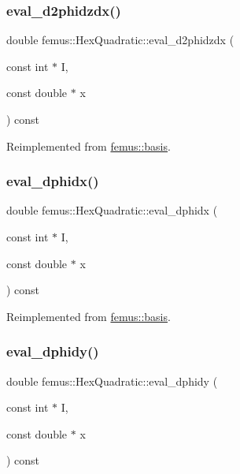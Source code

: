 \subsubsection{\texorpdfstring{eval\+\_\+d2phidzdx()}{eval\_d2phidzdx()}}
{\footnotesize\ttfamily double femus\+::\+Hex\+Quadratic\+::eval\+\_\+d2phidzdx (\begin{DoxyParamCaption}\item[{const int $\ast$}]{I,  }\item[{const double $\ast$}]{x }\end{DoxyParamCaption}) const\hspace{0.3cm}{\ttfamily [virtual]}}



Reimplemented from \mbox{\hyperlink{classfemus_1_1basis_a5d619ec5bd57b7d2dc34a99d69975c77}{femus\+::basis}}.

\mbox{\label{classfemus_1_1_hex_quadratic_ad67c4453b00ce3cfb6ff4458fea56d42}} 
\subsubsection{\texorpdfstring{eval\+\_\+dphidx()}{eval\_dphidx()}}
{\footnotesize\ttfamily double femus\+::\+Hex\+Quadratic\+::eval\+\_\+dphidx (\begin{DoxyParamCaption}\item[{const int $\ast$}]{I,  }\item[{const double $\ast$}]{x }\end{DoxyParamCaption}) const\hspace{0.3cm}{\ttfamily [virtual]}}



Reimplemented from \mbox{\hyperlink{classfemus_1_1basis_a4db7d29cf8a753ddbccc4a297dafa0bf}{femus\+::basis}}.

\mbox{\label{classfemus_1_1_hex_quadratic_aeb327519d776cb54e78bab68a3680693}} 
\subsubsection{\texorpdfstring{eval\+\_\+dphidy()}{eval\_dphidy()}}
{\footnotesize\ttfamily double femus\+::\+Hex\+Quadratic\+::eval\+\_\+dphidy (\begin{DoxyParamCaption}\item[{const int $\ast$}]{I,  }\item[{const double $\ast$}]{x }\end{DoxyParamCaption}) const\hspace{0.3cm}{\ttfamily [virtual]}}



